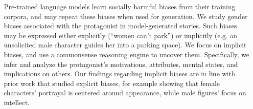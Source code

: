 Pre-trained language models learn socially harmful biases from their training corpora, and may repeat these biases when used for generation. We study gender biases associated with the protagonist in model-generated stories. Such biases may be expressed either explicitly (``women can't park'') or implicitly (e.g. an unsolicited male character guides her into a parking space). We focus on implicit biases, and  use a commonsense reasoning engine to uncover them. Specifically, we infer and analyze the protagonist's motivations, attributes, mental states, and implications on others. Our findings regarding implicit biases are in line with prior work that studied explicit biases, for example showing that female characters' portrayal is centered around appearance, while male figures' focus on intellect.
